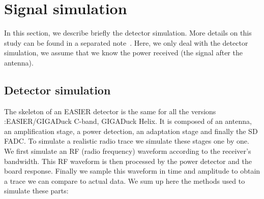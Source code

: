 \section{Signal simulation}
\label{sec:signalsim}
In  this section, we  describe briefly  the detector  simulation. More
details   on    this   study   can    be   found   in    a   separated
note~\cite{noteelec}. Here, we only deal with the detector simulation,
we  assume that  we  know the  power  received (the  signal after  the
antenna).
\subsection{Detector simulation}
The skeleton  of an EASIER detector  is the same for  all the versions
:EASIER/GIGADuck  C-band,  GIGADuck  Helix.   It  is  composed  of  an
antenna,  an amplification  stage,  a power  detection, an  adaptation
stage and finally the SD FADC.  To simulate a realistic radio trace we
simulate  these stages  one by  one. We  first simulate  an  RF (radio
frequency)  waveform according  to the  receiver's bandwidth.  This RF
waveform  is  then processed  by  the  power  detector and  the  board
response. Finally  we sample  this waveform in  time and  amplitude to
obtain  a trace we  can compare  to actual  data. We  sum up  here the
methods used to simulate these parts:
